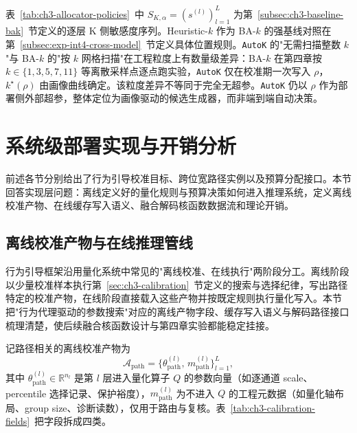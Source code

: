 表~\ref{tab:ch3-allocator-policies}~中 $S_{K,\alpha}=(s^{(l)})_{l=1}^{L}$ 为第~\ref{subsec:ch3-baseline-bak}~节定义的逐层 K 侧敏感度序列。Heuristic-$k$ 作为 BA-$k$ 的强基线对照在第~\ref{subsec:exp-int4-cross-model}~节定义具体位置规则。\texttt{AutoK} 的"无需扫描整数 $k$"与 BA-$k$ 的"按 $k$ 网格扫描"在工程粒度上有数量级差异：BA-$k$ 在第四章按 $k\in\{1,3,5,7,11\}$ 等离散采样点逐点跑实验，\texttt{AutoK} 仅在校准期一次写入 $\rho$，$k^\star(\rho)$ 由画像曲线确定。该粒度差异不等同于完全无超参。\texttt{AutoK} 仍以 $\rho$ 作为部署侧外部超参，整体定位为画像驱动的候选生成器，而非端到端自动决策。

\section{系统级部署实现与开销分析}
\label{sec:ch3-deployment}
\label{sec:ch3-triton}

前述各节分别给出了行为引导校准目标、跨位宽路径实例以及预算分配接口。本节回答实现层问题：离线定义好的量化规则与预算决策如何进入推理系统，定义离线校准产物、在线缓存写入语义、融合解码核函数数据流和理论开销。

\subsection{离线校准产物与在线推理管线}
\label{subsec:ch3-deployment-calibration}

行为引导框架沿用量化系统中常见的"离线校准、在线执行"两阶段分工。离线阶段以少量校准样本执行第~\ref{sec:ch3-calibration}~节定义的搜索与选择纪律，写出路径特定的校准产物，在线阶段直接载入这些产物并按既定规则执行量化写入。本节把"行为代理驱动的参数搜索"对应的离线产物字段、缓存写入语义与解码路径接口梳理清楚，使后续融合核函数设计与第四章实验都能稳定挂接。

记路径相关的离线校准产物为
\begin{equation}
\mathcal A_{\mathrm{path}}
=
\bigl\{
\theta_{\mathrm{path}}^{(l)},\,
m_{\mathrm{path}}^{(l)}
\bigr\}_{l=1}^{L},
\end{equation}
其中 $\theta_{\mathrm{path}}^{(l)}\in\mathbb{R}^{n_l}$ 是第 $l$ 层进入量化算子 $Q$ 的参数向量（如逐通道 scale、percentile 选择记录、保护裕度），$m_{\mathrm{path}}^{(l)}$ 为不进入 $Q$ 的工程元数据（如量化轴布局、group size、诊断读数），仅用于路由与复核。表~\ref{tab:ch3-calibration-fields}~把字段拆成四类。

